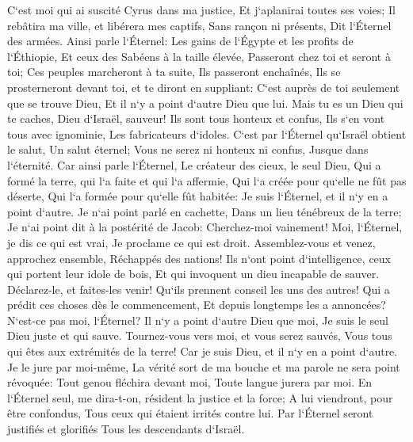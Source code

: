 \verse C`est moi qui ai suscité Cyrus dans ma justice, Et j`aplanirai toutes ses voies; Il rebâtira ma ville, et libérera mes captifs, Sans rançon ni présents, Dit l`Éternel des armées. 
\verse Ainsi parle l`Éternel: Les gains de l`Égypte et les profits de l`Éthiopie, Et ceux des Sabéens à la taille élevée, Passeront chez toi et seront à toi; Ces peuples marcheront à ta suite, Ils passeront enchaînés, Ils se prosterneront devant toi, et te diront en suppliant: C`est auprès de toi seulement que se trouve Dieu, Et il n`y a point d`autre Dieu que lui. 
\verse Mais tu es un Dieu qui te caches, Dieu d`Israël, sauveur! 
\verse Ils sont tous honteux et confus, Ils s`en vont tous avec ignominie, Les fabricateurs d`idoles. 
\verse C`est par l`Éternel qu`Israël obtient le salut, Un salut éternel; Vous ne serez ni honteux ni confus, Jusque dans l`éternité. 
\verse Car ainsi parle l`Éternel, Le créateur des cieux, le seul Dieu, Qui a formé la terre, qui l`a faite et qui l`a affermie, Qui l`a créée pour qu`elle ne fût pas déserte, Qui l`a formée pour qu`elle fût habitée: Je suis l`Éternel, et il n`y en a point d`autre. 
\verse Je n`ai point parlé en cachette, Dans un lieu ténébreux de la terre; Je n`ai point dit à la postérité de Jacob: Cherchez-moi vainement! Moi, l`Éternel, je dis ce qui est vrai, Je proclame ce qui est droit. 
\verse Assemblez-vous et venez, approchez ensemble, Réchappés des nations! Ils n`ont point d`intelligence, ceux qui portent leur idole de bois, Et qui invoquent un dieu incapable de sauver. 
\verse Déclarez-le, et faites-les venir! Qu`ils prennent conseil les uns des autres! Qui a prédit ces choses dès le commencement, Et depuis longtemps les a annoncées? N`est-ce pas moi, l`Éternel? Il n`y a point d`autre Dieu que moi, Je suis le seul Dieu juste et qui sauve. 
\verse Tournez-vous vers moi, et vous serez sauvés, Vous tous qui êtes aux extrémités de la terre! Car je suis Dieu, et il n`y en a point d`autre. 
\verse Je le jure par moi-même, La vérité sort de ma bouche et ma parole ne sera point révoquée: Tout genou fléchira devant moi, Toute langue jurera par moi. 
\verse En l`Éternel seul, me dira-t-on, résident la justice et la force; A lui viendront, pour être confondus, Tous ceux qui étaient irrités contre lui. 
\verse Par l`Éternel seront justifiés et glorifiés Tous les descendants d`Israël. 

